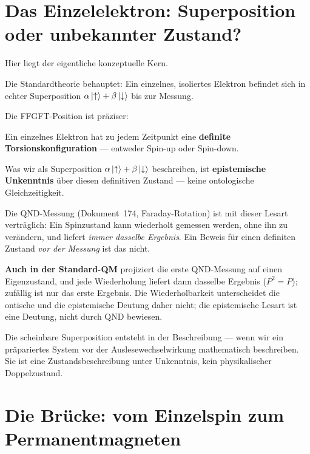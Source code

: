 \section{Das Einzelelektron: Superposition oder unbekannter Zustand?}
\label{sec:einzelelektron}

Hier liegt der eigentliche konzeptuelle Kern.

Die Standardtheorie behauptet: Ein einzelnes, isoliertes Elektron
befindet sich in echter Superposition
$\alpha\left|\uparrow\right\rangle + \beta\left|\downarrow\right\rangle$
bis zur Messung.

Die FFGFT-Position ist präziser:

\begin{foundation}
Ein einzelnes Elektron hat zu jedem Zeitpunkt eine
\textbf{definite Torsionskonfiguration} ---
entweder Spin-up oder Spin-down.

Was wir als Superposition $\alpha\left|\uparrow\right\rangle + \beta\left|\downarrow\right\rangle$
beschreiben, ist \textbf{epistemische Unkenntnis} über diesen
definitiven Zustand --- keine ontologische Gleichzeitigkeit.

Die QND-Messung (Dokument~174,
Faraday-Rotation) ist mit dieser Lesart verträglich: Ein Spinzustand
kann wiederholt gemessen werden, ohne ihn zu verändern, und liefert
\emph{immer dasselbe Ergebnis}. Ein Beweis für einen definiten Zustand
\emph{vor der Messung} ist das nicht.

\textbf{Auch in der Standard-QM} projiziert die erste QND-Messung
auf einen Eigenzustand, und jede Wiederholung liefert dann dasselbe
Ergebnis ($P^2 = P$); zufällig ist nur das erste Ergebnis.
Die Wiederholbarkeit unterscheidet die ontische und die epistemische
Deutung daher nicht; die epistemische Lesart ist eine Deutung,
nicht durch QND bewiesen.
\end{foundation}

Die scheinbare Superposition entsteht in der Beschreibung ---
wenn wir ein präpariertes System vor der Auslesewechselwirkung
mathematisch beschreiben.
Sie ist eine Zustandsbeschreibung unter Unkenntnis,
kein physikalischer Doppelzustand.

\section{Die Brücke: vom Einzelspin zum Permanentmagneten}
\label{sec:bruecke}


